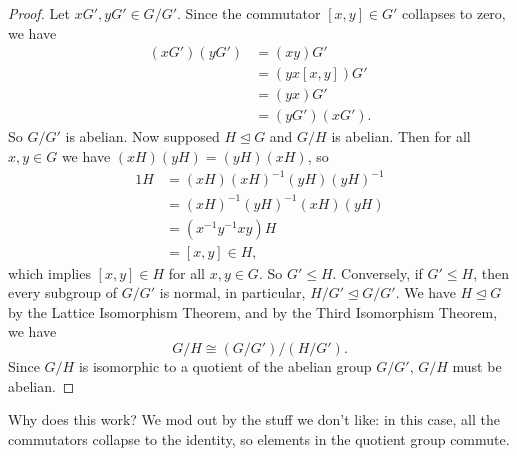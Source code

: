 \begin{proof}
    Let $xG',yG'\in G /G'$. Since the commutator $[x,y]\in G'$ collapses to zero, we have 
    \begin{align*}
        (xG')(yG')&=(xy)G'\\
                  &=(yx[x,y])G'\\
                  &=(yx)G'\\
                  &=(yG')(xG').
    \end{align*}
    So $G /G'$ is abelian. Now supposed $H \trianglelefteq G$ and $G /H$ is abelian. Then for all $x,y\in G$ we have $(xH)(yH)=(yH)(xH)$, so
    \begin{align*}
        1H &= (xH)(xH)^{-1}(yH)(yH)^{-1}\\
           &=(xH)^{-1}(yH)^{-1}(xH)(yH)\\
           &=(x^{-1}y^{-1}xy)H\\
           &=[x,y]\in H,
    \end{align*}
    which implies $[x,y]\in H$ for all $x,y\in G$. So $G'\leq H$. Conversely, if  $G' \leq H$, then every subgroup of $G /G'$ is normal, in particular, $H /G' \trianglelefteq G /G'$. We have $H \trianglelefteq G$ by the Lattice Isomorphism Theorem, and by the Third Isomorphism Theorem, we have \[
        G/H\cong (G /G') / (H / G').
    \] Since $G /H$ is isomorphic to a quotient of the abelian group $G /G'$, $G /H$ must be abelian.
\end{proof}
Why does this work? We mod out by the stuff we don't like: in this case, all the commutators collapse to the identity, so elements in the quotient group commute.

